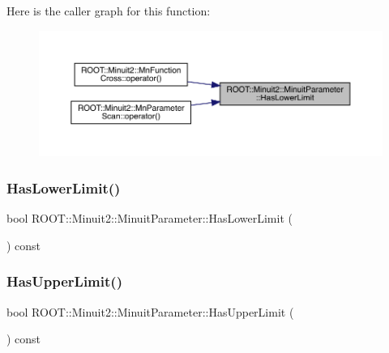 Here is the caller graph for this function\+:\nopagebreak
\begin{figure}[H]
\begin{center}
\leavevmode
\includegraphics[width=350pt]{dd/dfb/classROOT_1_1Minuit2_1_1MinuitParameter_a61b9c27aff1b1d7bf85bed898dd50dda_icgraph}
\end{center}
\end{figure}
\mbox{\label{classROOT_1_1Minuit2_1_1MinuitParameter_a61b9c27aff1b1d7bf85bed898dd50dda}} 
\subsubsection{\texorpdfstring{HasLowerLimit()}{HasLowerLimit()}\hspace{0.1cm}{\footnotesize\ttfamily [2/2]}}
{\footnotesize\ttfamily bool R\+O\+O\+T\+::\+Minuit2\+::\+Minuit\+Parameter\+::\+Has\+Lower\+Limit (\begin{DoxyParamCaption}{ }\end{DoxyParamCaption}) const\hspace{0.3cm}{\ttfamily [inline]}}

\mbox{\label{classROOT_1_1Minuit2_1_1MinuitParameter_a821e242fbbf23461e3b66a59126f3f02}} 
\subsubsection{\texorpdfstring{HasUpperLimit()}{HasUpperLimit()}\hspace{0.1cm}{\footnotesize\ttfamily [1/2]}}
{\footnotesize\ttfamily bool R\+O\+O\+T\+::\+Minuit2\+::\+Minuit\+Parameter\+::\+Has\+Upper\+Limit (\begin{DoxyParamCaption}{ }\end{DoxyParamCaption}) const\hspace{0.3cm}{\ttfamily [inline]}}

